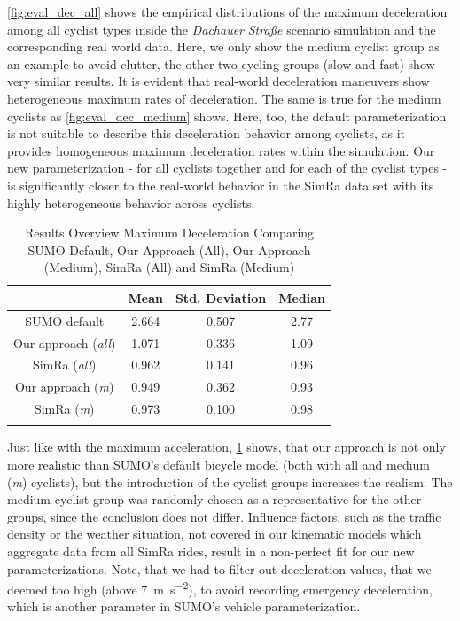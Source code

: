 \cref{fig:eval_dec_all} shows the empirical distributions of the maximum deceleration among all cyclist types inside the \textit{Dachauer} \textit{Straße} scenario simulation and the corresponding real world data.
Here, we only show the medium cyclist group as an example to avoid clutter, the other two cycling groups (slow and fast) show very similar results.
It is evident that real-world deceleration maneuvers show heterogeneous maximum rates of deceleration.
The same is true for the medium cyclists as \cref{fig:eval_dec_medium} shows.
Here, too, the default parameterization is not suitable to describe this deceleration behavior among cyclists, as it provides homogeneous maximum deceleration rates within the simulation.
Our new parameterization - for all cyclists together and for each of the cyclist types - is significantly closer to the real-world behavior in the SimRa data set with its highly heterogeneous behavior across cyclists.
\begin{table}
\centering
\caption{Results Overview Maximum Deceleration Comparing SUMO Default, Our Approach (All), Our Approach (Medium), SimRa (All) and SimRa (Medium)}%
\label{tab:results_overview_dec}
\begin{tabular}{cccc}
\toprule
& Mean & Std. Deviation & Median\\
\midrule
\midrule
SUMO default & \num{2.664} & \num{0.507} & \num{2.77} \\
\midrule
Our approach (\textit{all}) & \num{1.071} & \num{0.336} & \num{1.09} \\
SimRa (\textit{all}) & \num{0.962} & \num{0.141} & \num{0.96} \\
\midrule
Our approach (\textit{m}) & \num{0.949} & \num{0.362} & \num{0.93} \\
SimRa (\textit{m}) & \num{0.973} & \num{0.100} & \num{0.98} \\
\bottomrule&
\end{tabular}
\end{table}
Just like with the maximum acceleration, \cref{tab:results_overview_dec} shows, that our approach is not only more realistic than SUMO's default bicycle model (both with all and medium (\textit{m}) cyclists), but the introduction of the cyclist groups increases the realism.
The medium cyclist group was randomly chosen as a representative for the other groups, since the conclusion does not differ.
Influence factors, such as the traffic density or the weather situation, not covered in our kinematic models which aggregate data from all SimRa rides, result in a non-perfect fit for our new parameterizations.
Note, that we had to filter out deceleration values, that we deemed too high (above \SI{7}{\m\per\s\squared}), to avoid recording emergency deceleration, which is another parameter in SUMO's vehicle parameterization.

